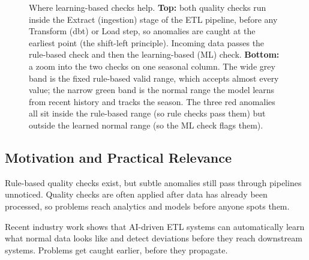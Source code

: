 \documentclass[12pt]{article}
\begin{document}
\begin{figure}[!htbp]
\begin{center}
\end{center}
\caption{Where learning-based checks help. \textbf{Top:} both quality checks run inside the Extract (ingestion) stage of the ETL pipeline, before any Transform (dbt) or Load step, so anomalies are caught at the earliest point (the shift-left principle). Incoming data passes the rule-based check and then the learning-based (ML) check. \textbf{Bottom:} a zoom into the two checks on one seasonal column. The wide grey band is the fixed rule-based valid range, which accepts almost every value; the narrow green band is the normal range the model learns from recent history and tracks the season. The three red anomalies all sit inside the rule-based range (so rule checks pass them) but outside the learned normal range (so the ML check flags them).}
\label{fig:intuition}
\end{figure}

\subsection{Motivation and Practical Relevance}

Rule-based quality checks exist, but subtle anomalies still pass through pipelines unnoticed. Quality checks are often applied after data has already been processed, so problems reach analytics and models before anyone spots them.

Recent industry work \cite{databricks2025aietl} shows that AI-driven ETL systems can automatically learn what normal data looks like and detect deviations before they reach downstream systems. Problems get caught earlier, before they propagate.
\end{document}
